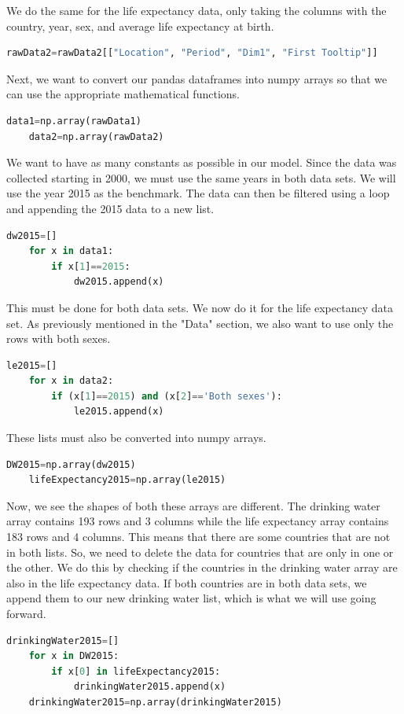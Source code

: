 \documentclass[12pt]{article}
\begin{document}
We do the same for the life expectancy data, only taking the columns with the country, year, sex, and average life expectancy at birth.
\begin{lstlisting}[language=Python]
    rawData2=rawData2[["Location", "Period", "Dim1", "First Tooltip"]]
\end{lstlisting}

Next, we want to convert our pandas dataframes into numpy arrays so that we can use the appropriate mathematical functions.
\begin{lstlisting}[language=Python]
    data1=np.array(rawData1)
    data2=np.array(rawData2)
\end{lstlisting}

We want to have as many constants as possible in our model. Since the data was collected starting in 2000, we must use the same years in both data sets. We will use the year 2015 as the benchmark. The data can then be filtered using a loop and appending the 2015 data to a new list.
\begin{lstlisting}[language=Python]
    dw2015=[]
    for x in data1:
        if x[1]==2015:
            dw2015.append(x)
\end{lstlisting}

This must be done for both data sets. We now do it for the life expectancy data set. As previously mentioned in the "Data" section, we also want to use only the rows with both sexes.
\begin{lstlisting}[language=Python]
    le2015=[]
    for x in data2:
        if (x[1]==2015) and (x[2]=='Both sexes'):
            le2015.append(x)
\end{lstlisting}

These lists must also be converted into numpy arrays.
\begin{lstlisting}[language=Python]
    DW2015=np.array(dw2015)
    lifeExpectancy2015=np.array(le2015)
\end{lstlisting}

Now, we see the shapes of both these arrays are different. The drinking water array contains 193 rows and 3 columns while the life expectancy array contains 183 rows and 4 columns. This means that there are some countries that are not in both lists. So, we need to delete the data for countries that are only in one or the other. We do this by checking if the countries in the drinking water array are also in the life expectancy data. If both countries are in both data sets, we append them to our new drinking water list, which is what we will use going forward.
\begin{lstlisting}[language=Python]
    drinkingWater2015=[]
    for x in DW2015:
        if x[0] in lifeExpectancy2015:
            drinkingWater2015.append(x)
    drinkingWater2015=np.array(drinkingWater2015)
\end{lstlisting}
\end{document}
